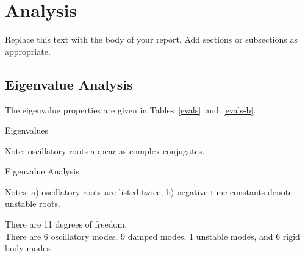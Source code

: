 \chapter{Analysis}
Replace this text with the body of your report.  Add sections or subsections as appropriate.
\section{Eigenvalue Analysis}
The eigenvalue properties are given in Tables~\ref{evals}~and~\ref{evals-b}.

\begin{table}[ht]
\begin{center}
\begin{threeparttable}
\begin{footnotesize}
\caption{Eigenvalues}
\label{evals}
\begin{tablenotes}
\item Note: oscillatory roots appear as complex conjugates.
\end{tablenotes}
\end{footnotesize}
\end{threeparttable}
\end{center}
\end{table}
\begin{table}[ht]
\begin{center}
\begin{threeparttable}
\begin{footnotesize}
\caption{Eigenvalue Analysis}
\label{evals-b}
\begin{tablenotes}
\item Notes: a) oscillatory roots are listed twice, b) negative time constants denote unstable roots.
\end{tablenotes}
\end{footnotesize}
\end{threeparttable}
\end{center}
\end{table}
There are 11 degrees of freedom.\\

There are 6 oscillatory modes, 9 damped modes, 1 unstable modes, and 6 rigid body modes.
\pagebreak
